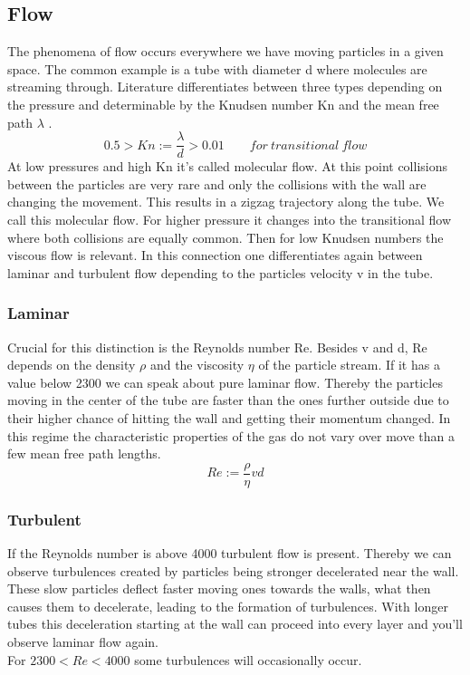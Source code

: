 \documentclass[]{article}
\begin{document}
\subsection{Flow}
The phenomena of flow occurs everywhere we have moving particles in a given space. The common example is a tube with diameter d where molecules are streaming through. Literature differentiates between three types depending on the pressure and determinable by the Knudsen number Kn and the mean free path $\lambda$ .
\[ 0.5 > Kn := \frac{\lambda}{d} > 0.01 \qquad for\: transitional\: flow\]
At low pressures and high Kn it's called molecular flow. At this point collisions between the particles are very rare and only the collisions with the wall are changing the movement. This results in a zigzag trajectory along the tube. We call this molecular flow. For higher pressure it changes into the transitional flow where both collisions are equally common. Then for low Knudsen numbers the viscous flow is relevant. In this connection one differentiates again between laminar and turbulent flow depending to the particles velocity v in the tube.

\subsubsection{Laminar}
Crucial for this distinction is the Reynolds number Re. Besides v and d, Re depends on the density $\rho$ and the viscosity $\eta$ of the particle stream. If it has a value below 2300 we can speak about pure laminar flow. Thereby the particles moving in the center of the tube are faster than the ones further outside due to their higher chance of hitting the wall and getting their momentum changed. In this regime the characteristic properties of the gas do not vary over move than a few mean free path lengths.  
\[ Re:= \frac{\rho}{\eta} v d\]

\subsubsection{Turbulent}
If the Reynolds number is above 4000 turbulent flow is present. Thereby we can observe turbulences created by particles being stronger decelerated near the wall. These slow particles deflect faster moving ones towards the walls, what then causes them to decelerate, leading to the formation of turbulences. With longer tubes this deceleration starting at the wall can proceed into every layer and you'll observe laminar flow again. \\
For $2300 < Re < 4000$ some turbulences will occasionally occur.
\end{document}
